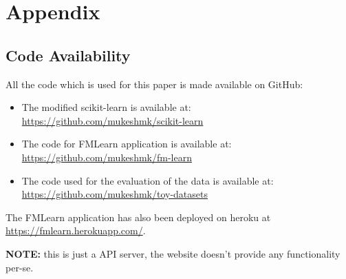 \chapter{Appendix}
\section{Code Availability}
All the code which is used for this paper is made available on GitHub:
\begin{itemize}
    \item The modified scikit-learn is available at: \newline \href{https://github.com/mukeshmk/scikit-learn}{https://github.com/mukeshmk/scikit-learn}
    \item The code for FMLearn application is available at: \newline \href{https://github.com/mukeshmk/fm-learn}{https://github.com/mukeshmk/fm-learn}
    \item The code used for the evaluation of the data is available at: \newline \href{https://github.com/mukeshmk/toy-datasets}{https://github.com/mukeshmk/toy-datasets}
\end{itemize}
The FMLearn application has also been deployed on heroku at \href{https://fmlearn.herokuapp.com/}{https://fmlearn.herokuapp.com/}. 

\textbf{NOTE:} this is just a API server, the website doesn't provide any functionality per-se.